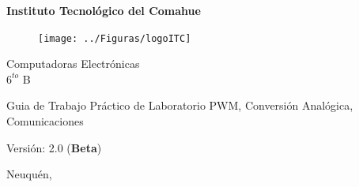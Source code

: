 \documentclass[10pt,conference,a4paper,onecolumn]{article}%
\begin{document}



\begin{titlepage}
\centering
\begin{Huge}
 
\textbf{Instituto Tecnológico del Comahue}  \\

\end{Huge}


\vspace{2cm}
\begin{figure}[h]
\centering
\texttt{[image: ../Figuras/logoITC]}
\end{figure}

\vspace{2cm}
\normalsize
\begin{LARGE}


 Computadoras Electrónicas \\

$6^{to}$ B  
 
 \end{LARGE}
 \vspace{2cm}
\begin{Large}
Guia de Trabajo Práctico de Laboratorio PWM, Conversión Analógica, Comunicaciones 
\end{Large}
\vspace{2cm}
\normalsize 
\begin{flushleft}
Versión: 2.0 (\textbf{Beta})
\end{flushleft}

\vspace{1cm}


\centering Neuquén, \the\year \\


\vspace{1cm}



\end{titlepage}
\end{document}
